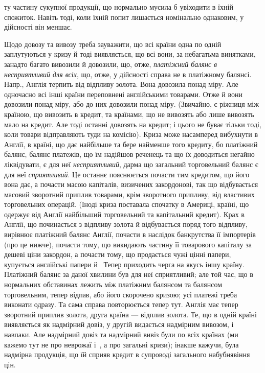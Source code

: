 \parcont{}  %
ту частину сукупної продукції, що нормально мусила б увіходити в їхній спожиток.
Навіть тоді, коли їхній попит лишається номінально однаковим, у дійсності він
меншає.

Щодо довозу та вивозу треба зауважити, що всі країни одна по одній
заплутуються у кризу й тоді виявляється, що всі вони, за небагатьма винятками,
занадто багато вивозили й довозили, що, отже, \emph{платіжний балянс в несприятливий
для всіх}, що, отже, у дійсності справа не в платіжному балянсі.
Напр., Англія терпить від відпливу золота. Вона довозила понад міру. Але одночасно
всі інші країни переповнені англійськими товарами. Отже й вони довозили
понад міру, або до них довозили понад міру. (Звичайно, є ріжниця між країною,
що вивозить в кредит, та країнами, що не вивозять або лише вивозять мало
на кредит. Але тоді останні довозять на кредит; і цього не буває тільки тоді,
коли товари відправляють туди на комісію). Криза може насамперед вибухнути
в Англії, в країні, що дає найбільше та бере найменше того кредиту, бо платіжний
балянс, балянс платежів, що їм надійшов реченець та що їх доводиться
негайно ліквідувати, є для неї \emph{несприятливий}, дарма що загальний торговельний
балянс є для неї \emph{сприятливий}. Це останнє пояснюється почасти тим
кредитом, що його вона дає, а почасти масою капіталів, визичених закордонові,
так що відбувається масовий зворотний приплив товарами, крім зворотного припливу,
від властивих торговельних операцій. (Іноді криза поставала спочатку в
Америці, країні, що одержує від Англії найбільший торговельний та капітальний
кредит). Крах в Англії, що починається з відпливу золота й відбувається поряд того
відпливу, вирівнює платіжний балянс Англії, почасти в наслідок банкрутства її
імпортерів (про це нижче), почасти тому, що викидають частину її товарового капіталу
за дешеві ціни закордон, а почасти тому, що продається чужі цінні папери,
купується англійські папери й~ Тепер приходить черга на якусь іншу
країну. Платіжний балянс за даної хвилини був для неї сприятливий; але той
час, що в нормальних обставинах лежить між платіжним балянсом та балянсом
торговельним, тепер відпав, або його скорочено кризою; усі платежі треба виконати
одразу. Та сама справа повторюється тепер тут. Англія має тепер зворотний
приплив золота, друга країна — відплив золота. Те, що в одній країні виявляється
як надмірний довіз, у другій видається надмірним вивозом, і навпаки. Але надмірний
довіз та надмірний вивіз були по всіх країнах (ми кажемо тут не про
неврожаї і~, а про загальні кризи); інакше кажучи, була надмірна продукція,
що їй сприяв кредит в супроводі загального набубнявіння цін.

